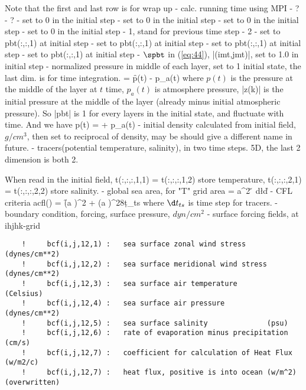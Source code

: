 Note that the first and last row is for wrap up
 - calc. running time using MPI
 - ?
 - ?
 - set to 0 in the initial step
 - set to 0 in the initial step
 - set to 0 in the initial step
 - set to 0 in the initial step
 - 1, stand for previous time step
 - 2
 - set to pbt(:,:,1) at initial step
 -  set to pbt(:,:,1) at initial step
 - set to pbt(:,:,1) at initial step
 -  set to pbt(:,:,1) at initial step
 - $\spbt$ in (\ref{eq:44}), |(imt,jmt)|, set to 1.0 in initial step
 - normalized pressure in middle of each layer, set to 1 initial state, the
last dim. is for time integration.
\be
{} = \f{p(t) - p_a(t)}{}
\ee
where $p(t)$ is the pressure at the middle of the layer at $t$ time, $p_a(t)$ is
atmosphere pressure, |z(k)| is the initial pressure at the middle of the layer
(already minus initial atmospheric pressure). So |pbt| is 1 for every layers in
the initial state, and fluctuate with time. And we have
\be
p(t) =   + p_a(t)
\ee
{} - initial density calculated from initial field, $g/cm^3$,
    then set to reciprocal of density, 
    may be should give a different name in future.
 - tracers(potential temperature, salinity), in two time steps. 5D, the
  last 2 dimension is both 2. 
  \bi
  \item When read in the initial field, 
  t(:,:,:,1,1) = t(:,:,:,1,2) store temperature,
  t(:,:,:,2,1) = t(:,:,:,2,2) store salinity.
  \ei
{} - global sea area, for "T" grid
   \be
   area = \iint a^2 \cos\v {} d\l d\v
   \ee
{} - CFL criteria
   \be
   acfl(\jh) = \f{(a \cosfjh \dl)^2 + (a \df)^2}{8\d t_{ts}}
   \ee
   where $\d t_{ts}$ is time step for tracers.
 - boundary condition, forcing, surface pressure, $dyn/cm^2$
 - surface forcing fields, at ihjhk-grid
\begin{verbatim}
    !     bcf(i,j,12,1) :   sea surface zonal wind stress       (dynes/cm**2)
    !     bcf(i,j,12,2) :   sea surface meridional wind stress  (dynes/cm**2)
    !     bcf(i,j,12,3) :   sea surface air temperature       (Celsius)
    !     bcf(i,j,12,4) :   sea surface air pressure           (dynes/cm**2)
    !     bcf(i,j,12,5) :   sea surface salinity              (psu)
    !     bcf(i,j,12,6) :   rate of evaporation minus precipitation (cm/s)
    !     bcf(i,j,12,7) :   coefficient for calculation of Heat Flux (w/m2/c)
    !     bcf(i,j,12,7) :   heat flux, positive is into ocean (w/m^2) (overwritten)
\end{verbatim}
